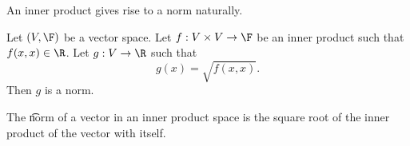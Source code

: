 

An inner product gives rise to a norm naturally.


\begin{prop}
  Let $(V, \F)$ be a vector space.
  Let $f: V \times V \to \F$ be an inner product such that $f(x, x) \in \R$.
Let $g: V \to \R$ such that
\[
  g(x) = \sqrt{f(x, x)}.
\]
Then $g$ is a norm.
\end{prop}

The \t{norm} of a vector in an inner product space is the square root of the inner product of the vector with itself.


